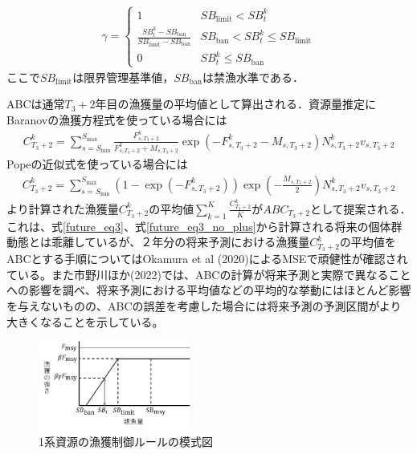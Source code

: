 \documentclass[11pt]{jsarticle}
\begin{document}
\begin{eqnarray}
  \gamma =
  \begin{cases}
    1   &  S\!B_{\mathrm{limit}} < S\!B_t^k \\
    \frac{S\!B_t^k-S\!B_{\mathrm{ban}}}{S\!B_{\mathrm{limit}} -S\!B_{\mathrm{ban}}}  & S\!B_{\mathrm{ban}} < S\!B_t^k \leq S\!B_{\mathrm{limit}} \\
    0    &   S\!B_t^k \leq S\!B_{\mathrm{ban}}
  \end{cases}
\end{eqnarray}
ここで$S\!B_{\mathrm{limit}}$は限界管理基準値，$S\!B_{\mathrm{ban}}$は禁漁水準である．

ABCは通常$T_{3}+2$年目の漁獲量の平均値として算出される．資源量推定にBaranovの漁獲方程式を使っている場合には
\begin{eqnarray}
  C_{T_3+2}^k=\sum_{s=S_{\mathrm{min}}}^{S_{\mathrm{max}}} \frac{F_{s,T_3+2}^k}{F_{s,T_3+2}^k+M_{s,T_3+2}}
  \exp(- F_{s,T_3+2}^k-M_{s,T_3+2}) N_{s,T_3+2}^k v_{s,T_3+2}
\label{ABC_eq1}
\end{eqnarray}
Popeの近似式を使っている場合には
\begin{eqnarray}
  C_{T_3+2}^k=\sum_{s=S_{\mathrm{min}}}^{S_{\mathrm{max}}} (1-\exp(- F_{s,T_3+2}^k)) \exp(-\frac{M_{s,T_3+2}}{2}) N_{s,T_3+2}^k v_{s,T_3+2}
\label{ABC_eq2}
\end{eqnarray}
より計算された漁獲量$C_{T_3+2}^k$の平均値$\sum_{k=1}^K \frac{C_{T_3+2}^k}{K}$が$ABC_{T_3+2}$として提案される．これは、式\ref{future_eq3}、式\ref{future_eq3_no_plus}から計算される将来の個体群動態とは乖離しているが、２年分の将来予測における漁獲量$C_{T_3+2}^k$の平均値をABCとする手順についてはOkamura et al (2020)\cite{okamura2020}によるMSEで頑健性が確認されている。また市野川ほか(2022)\cite{ichinokawa2022}では、ABCの計算が将来予測と実際で異なることへの影響を調べ、将来予測における平均値などの平均的な挙動にはほとんど影響を与えないものの、ABCの誤差を考慮した場合には将来予測の予測区間がより大きくなることを示している。

\begin{figure}[t]
  \includegraphics[width=5cm]{fig_HCR.png}  
  \caption{
    1系資源の漁獲制御ルールの模式図
  }
  \label{fig_HCR}
\end{figure}
\end{document}
